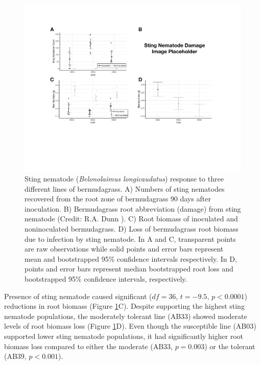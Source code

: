 \documentclass[fleqn,10pt]{wlscirep}
\begin{document}
\begin{figure}
\begin{fullwidth}
\includegraphics[width=0.95\linewidth]{figures/publication_figures/figure-1.pdf}
\caption{Sting nematode (\textit{Belonolaimus longicaudatus}) response to three different lines of bermudagrass.  A) Numbers of sting nematodes recovered from the root zone of bermudagrass 90 days after inoculation.  B) Bermudagrass root abbreviation (damage) from sting nematode (Credit: R.A. Dunn \cite{crow2001sting}).  C) Root biomass of inoculated and noninoculated bermudagrass.  D) Loss of bermudagrass root biomass due to infection by sting nematode.  In A and C, transparent points are raw observations while solid points and error bars represent mean and bootstrapped 95\% confidence intervals respectively.  In D, points and error bars represent median bootstrapped root loss and bootstrapped 95\% confidence intervals, respectively.   }
\label{fig:figure1}
\end{fullwidth}
\end{figure}

Presence of sting nematode caused significant ($df = 36$, $t = -9.5$, $p < 0.0001$) reductions in root biomass (Figure \ref{fig:figure1}C).  Despite supporting the highest sting nematode populations, the moderately tolerant line (AB33) showed moderate levels of root biomass loss (Figure \ref{fig:figure1}D). Even though the susceptible line (AB03) supported lower sting nematode populations, it had significantly higher root biomass loss compared to either the moderate (AB33, $p = 0.003$) or the tolerant (AB39, $p < 0.001$).  
\end{document}
